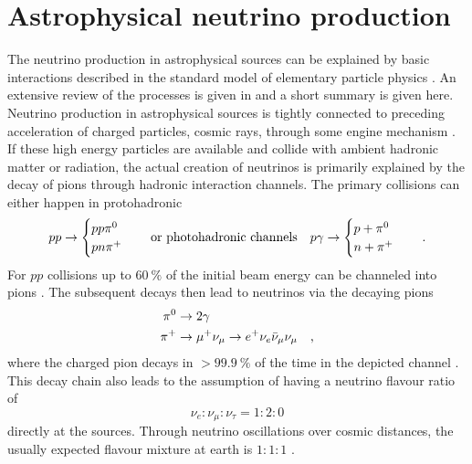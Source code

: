 \section{Astrophysical neutrino production}
The neutrino production in astrophysical sources can be explained by basic interactions described in the standard model of elementary particle physics .
An extensive review of the processes is given in  and a short summary is given here.
Neutrino production in astrophysical sources is tightly connected to preceding acceleration of charged particles, cosmic rays, through some engine mechanism .
If these high energy particles are available and collide with ambient hadronic matter or radiation, the actual creation of neutrinos is primarily explained by the decay of pions through hadronic interaction channels.
The primary collisions can either happen in protohadronic
\begin{equation}
  p p \rightarrow
    \begin{cases}
      p p \pi^0 \\
      p n \pi^+
    \end{cases}
    \quad\text{or photohadronic channels}\quad
  p \gamma \rightarrow
    \begin{cases}
      p + \pi^0 \\
      n + \pi^+
    \end{cases}
  \quad\text{.}
\end{equation}
For $pp$ collisions up to $\SI{60}{\percent}$ of the initial beam energy can be channeled into pions .
The subsequent decays then lead to neutrinos via the decaying pions
\begin{align}
  \pi^0 &\rightarrow 2\gamma \\
  \pi^+ &\rightarrow \mu^+ \nu_\mu \rightarrow e^+ \nu_e \bar{\nu}_\mu \nu_\mu
  \quad\text{,}
\end{align}
where the charged pion decays in $>\SI{99,9}{\percent}$ of the time in the depicted channel .
This decay chain also leads to the assumption of having a neutrino flavour ratio of
\begin{equation}
  \nu_e : \nu_\mu : \nu_\tau = 1 : 2 : 0
\end{equation}
directly at the sources.
Through neutrino oscillations over cosmic distances, the usually expected flavour mixture at earth is $1:1:1$ .

